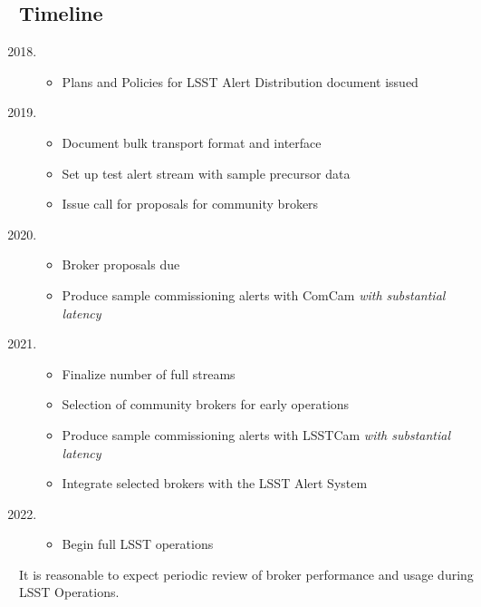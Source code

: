 \subsection{Timeline}

\begin{enumerate}
  \setcounter{enumi}{2017}
	\item \begin{itemize}
		\item Plans and Policies for LSST Alert Distribution document issued
	\end{itemize}
	\item \begin{itemize}
		\item Document bulk transport format and interface
		\item Set up test alert stream with sample precursor data
		\item Issue call for proposals for community brokers
		\end{itemize}
	\item \begin{itemize}
		\item Broker proposals due
		\item Produce sample commissioning alerts with ComCam \textit{with substantial latency}
		\end{itemize}
	\item \begin{itemize}
			\item Finalize number of full streams
			\item Selection of community brokers for early operations
			\item Produce sample commissioning alerts with LSSTCam \textit{with substantial latency}
			\item Integrate selected brokers with the LSST Alert System
		\end{itemize}

	\item \begin{itemize}
			\item Begin full LSST operations
	\end{itemize}

\end{enumerate}

It is reasonable to expect periodic review of broker performance and usage during LSST Operations.

